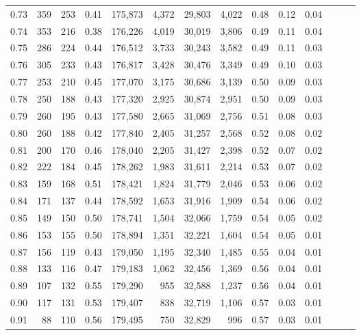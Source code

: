 \begin{tabular}{rrrrrrrrrrrrrr}
0.73 &    359 &  253 &  0.41 &  175,873 &    4,372 &  29,803 &   4,022 &  0.48 &  0.12 &      0.04 \\
0.74 &    353 &  216 &  0.38 &  176,226 &    4,019 &  30,019 &   3,806 &  0.49 &  0.11 &      0.04 \\
0.75 &    286 &  224 &  0.44 &  176,512 &    3,733 &  30,243 &   3,582 &  0.49 &  0.11 &      0.03 \\
0.76 &    305 &  233 &  0.43 &  176,817 &    3,428 &  30,476 &   3,349 &  0.49 &  0.10 &      0.03 \\
0.77 &    253 &  210 &  0.45 &  177,070 &    3,175 &  30,686 &   3,139 &  0.50 &  0.09 &      0.03 \\
0.78 &    250 &  188 &  0.43 &  177,320 &    2,925 &  30,874 &   2,951 &  0.50 &  0.09 &      0.03 \\
0.79 &    260 &  195 &  0.43 &  177,580 &    2,665 &  31,069 &   2,756 &  0.51 &  0.08 &      0.03 \\
0.80 &    260 &  188 &  0.42 &  177,840 &    2,405 &  31,257 &   2,568 &  0.52 &  0.08 &      0.02 \\
0.81 &    200 &  170 &  0.46 &  178,040 &    2,205 &  31,427 &   2,398 &  0.52 &  0.07 &      0.02 \\
0.82 &    222 &  184 &  0.45 &  178,262 &    1,983 &  31,611 &   2,214 &  0.53 &  0.07 &      0.02 \\
0.83 &    159 &  168 &  0.51 &  178,421 &    1,824 &  31,779 &   2,046 &  0.53 &  0.06 &      0.02 \\
0.84 &    171 &  137 &  0.44 &  178,592 &    1,653 &  31,916 &   1,909 &  0.54 &  0.06 &      0.02 \\
0.85 &    149 &  150 &  0.50 &  178,741 &    1,504 &  32,066 &   1,759 &  0.54 &  0.05 &      0.02 \\
0.86 &    153 &  155 &  0.50 &  178,894 &    1,351 &  32,221 &   1,604 &  0.54 &  0.05 &      0.01 \\
0.87 &    156 &  119 &  0.43 &  179,050 &    1,195 &  32,340 &   1,485 &  0.55 &  0.04 &      0.01 \\
0.88 &    133 &  116 &  0.47 &  179,183 &    1,062 &  32,456 &   1,369 &  0.56 &  0.04 &      0.01 \\
0.89 &    107 &  132 &  0.55 &  179,290 &      955 &  32,588 &   1,237 &  0.56 &  0.04 &      0.01 \\
0.90 &    117 &  131 &  0.53 &  179,407 &      838 &  32,719 &   1,106 &  0.57 &  0.03 &      0.01 \\
0.91 &     88 &  110 &  0.56 &  179,495 &      750 &  32,829 &     996 &  0.57 &  0.03 &      0.01 \\

\end{tabular}
